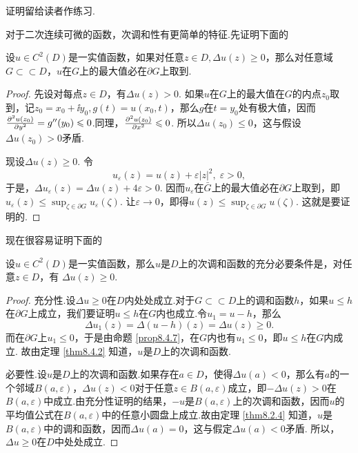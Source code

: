 证明留给读者作练习.

对于二次连续可微的函数，次调和性有更简单的特征.先证明下面的
\begin{prop}\label{prop8.4.7}
设$u\in C^2(D)$是一实值函数，如果对任意$z\in D,\Delta u(z)\ge0$，那么对任意域$G\subset\subset D$，$u$在$G$上的最大值必在$\partial G$上取到.
\end{prop}
\begin{proof}
先设对每点$z\in D$，有$\Delta u(z)>0$. 如果$u$在$G$上的最大值在$G$的内点$z_0$取到，记$z_0=x_0+\ii y_0,g(t)=u(x_0,t)$，那么$g$在$t=y_0$处有极大值，因而$\frac{\partial^2 u(z_0)}{\partial y^2}
=g''(y_0)\leqslant0$.同理，$\frac{\partial^2 u(z_0)}{\partial x^2}\leqslant0$. 所以$\Delta u(z_0)\le0$，这与假设$\Delta u(z_0)>0$矛盾.

现设$\Delta u(z)\ge0$. 令
\[u_\varepsilon(z)=u(z)+\varepsilon|z|^2,\;\varepsilon>0,\]
于是，$\Delta u_\varepsilon(z)=\Delta u(z)+4\varepsilon>0$. 因而$u_\varepsilon$在$\bar G$上的最大值必在$\partial G$上取到，即$u_\varepsilon(z)\le\sup_{\zeta\in\partial G}u_\varepsilon(\zeta)$. 让$\varepsilon\to0$，即得$u(z)\le\sup_{\zeta\in\partial G}u(\zeta)$. 这就是要证明的.
\end{proof}

现在很容易证明下面的
\begin{theorem}\label{eq8.4.8}
设$u\in C^2(D)$是一实值函数，那么$u$是$D$上的次调和函数的充分必要条件是，对任意$z\in D$，有
$\Delta u(z)\ge0$.
\end{theorem}
\begin{proof}
充分性.设$\Delta u\ge0$在$D$内处处成立.对于$G\subset\subset D$上的调和函数$h$，如果$u\le h$在$\partial G$上成立，我们要证明$u\le h$在$G$内也成立.令$u_1=u-h$，那么
\[\Delta u_1(z)=\Delta(u-h)(z)=\Delta u(z)\ge0.\]
而在$\partial G$上$u_1\le0$，于是由命题 \ref{prop8.4.7}，在$G$内也有$u_1\le0$，即$u\le h$在$G$内成立. 故由定理 \ref{thm8.4.2} 知道，$u$是$D$上的次调和函数.

必要性.设$u$是$D$上的次调和函数.如果存在$a\in D$，使得$\Delta u(a)<0$，那么有$a$的一个邻域$B(a,\varepsilon)$，$\Delta u(z)<0$对于任意$z\in B(a,\varepsilon)$成立，即$-\Delta u(z)>0$在$B(a,\varepsilon)$中成立.由充分性证明的结果，$-u$是$B(a,\varepsilon)$上的次调和函数，因而$u$的平均值公式在$B(a,\varepsilon)$中的任意小圆盘上成立.故由定理 \ref{thm8.2.4} 知道，$u$是$B(a,\varepsilon)$中的调和函数，因而$\Delta u(a)=0$，这与假定$\Delta u(a)<0$矛盾.
所以，$\Delta u\ge0$在$D$中处处成立.
\end{proof}

